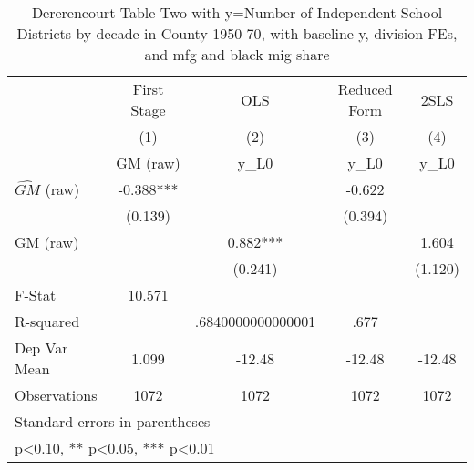 \begin{table}[htbp]\centering
\def\sym#1{\ifmmode^{#1}\else\(^{#1}\)\fi}
\caption{Dererencourt Table Two with y=Number of Independent School Districts by decade in County 1950-70, with baseline y, division FEs, and mfg and black mig share}
\begin{tabular}{l*{4}{c}}
\toprule
                    & First Stage   &         OLS   &Reduced Form   &        2SLS   \\
                    &\multicolumn{1}{c}{(1)}&\multicolumn{1}{c}{(2)}&\multicolumn{1}{c}{(3)}&\multicolumn{1}{c}{(4)}\\
                    &\multicolumn{1}{c}{GM  (raw)}&\multicolumn{1}{c}{y\_L0}&\multicolumn{1}{c}{y\_L0}&\multicolumn{1}{c}{y\_L0}\\
\midrule
$\hat{GM}$ (raw)    &      -0.388***&               &      -0.622   &               \\
                    &     (0.139)   &               &     (0.394)   &               \\
\addlinespace
GM  (raw)           &               &       0.882***&               &       1.604   \\
                    &               &     (0.241)   &               &     (1.120)   \\
\midrule
F-Stat              &      10.571   &               &               &               \\
R-squared           &               &.6840000000000001   &        .677   &               \\
Dep Var Mean        &       1.099   &      -12.48   &      -12.48   &      -12.48   \\
Observations        &        1072   &        1072   &        1072   &        1072   \\
\bottomrule
\multicolumn{5}{l}{\footnotesize Standard errors in parentheses}\\
\multicolumn{5}{l}{\footnotesize * p<0.10, ** p<0.05, *** p<0.01}\\
\end{tabular}
\end{table}
